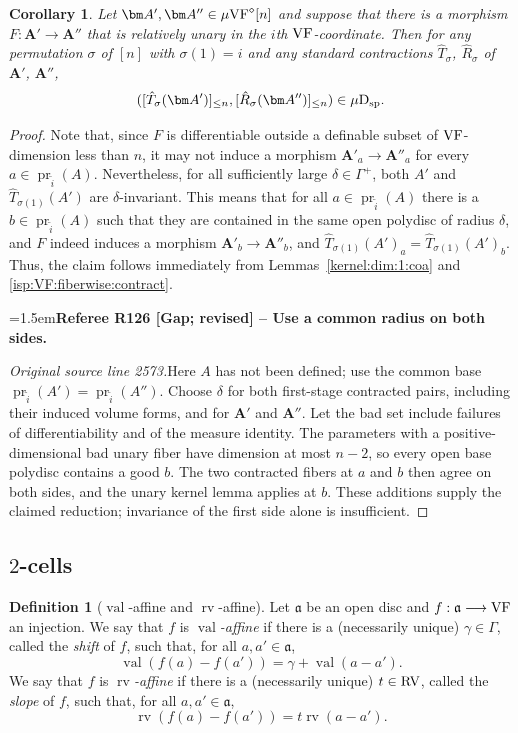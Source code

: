 \documentclass[12pt]{amsart}
\newcommand{\RefereeRemark}[4]{%
  \par\medskip\begingroup\normalfont\small\color{RefereePurple}%
  \emergencystretch=1.5em\noindent\textbf{Referee R#1 [#2] -- #3.}\par\nobreak\noindent #4\par
  \endgroup\medskip
}
\newcommand{\memph}[1]{{\color{magenta}\emph{#1}}}
\theoremstyle{plain}
\newtheorem{cor}[thm]{Corollary}
\theoremstyle{definition}
\newtheorem{defn}[thm]{Definition}
\theoremstyle{remark}
\numberwithin{equation}{section}
\theoremstyle{plain}
\newcommand{\VF}{\textup{VF}}
\newcommand{\RV}{\textup{RV}}
\DeclareMathOperator{\pr}{pr}
\newcommand{\ga}{\mathfrak{a}}
\newcommand{\0}{\emptyset}
\newcommand{\fun}{\longrightarrow}
\newcommand{\mVF}{{\mu}{\VF}}
\newcommand{\dsp}{\textup{D}_{\textup{sp}}}
\newcommand{\mispdb}{\mu \dsp}
\DeclareMathOperator{\rv}{rv}
\DeclareMathOperator{\vv}{val}
\begin{document}
\begin{cor}\label{contraction:same:perm:isp}
Let $\bm A', \bm A'' \in \mVF^{\diamond}[n]$ and suppose that there is a morphism $F : \bm A' \fun \bm A''$ that is relatively unary in the $i$th $\VF$-coordinate. Then for any permutation $\sigma$ of $[n]$ with $\sigma(1) = i$ and any standard contractions $\hat T_{\sigma}$, $\hat R_{\sigma}$ of $\bm A'$, $\bm A''$,
\[
([\hat T_{\sigma}(\bm A')]_{\leq n}, [\hat R_{\sigma}(\bm A'')]_{\leq n}) \in \mispdb.
\]
\end{cor}
\begin{proof}
Note that, since $F$ is differentiable outside a definable subset of $\VF$-dimension less than $n$, it may not induce a morphism $\bm A'_a \fun \bm A''_a$ for every $a \in \pr_{\tilde i}(A)$. Nevertheless, for all sufficiently large $\delta \in \Gamma^+$, both $A'$ and $\hat T_{\sigma(1)}(A')$ are $\delta$-invariant. This means that for all $a \in \pr_{\tilde i}(A)$ there is a $b \in \pr_{\tilde i}(A)$ such that they are contained in the same open polydisc of radius $\delta$, and $F$ indeed induces a morphism $\bm A'_b \fun \bm A''_b$, and $\hat T_{\sigma(1)}(A')_a = \hat T_{\sigma(1)}(A')_b$. Thus, the claim follows immediately from Lemmas~\ref{kernel:dim:1:coa} and \ref{isp:VF:fiberwise:contract}.

\RefereeRemark{126}{Gap; revised}{Use a common radius on both sides}{%
\textit{Original source line 2573.}\quad Here $A$ has not been defined; use the common base $\pr_{\tilde i}(A')=\pr_{\tilde i}(A'')$. Choose $\delta$ for both first-stage contracted pairs, including their induced volume forms, and for $\bm A'$ and $\bm A''$. Let the bad set include failures of differentiability and of the measure identity. The parameters with a positive-dimensional bad unary fiber have dimension at most $n-2$, so every open base polydisc contains a good $b$. The two contracted fibers at $a$ and $b$ then agree on both sides, and the unary kernel lemma applies at $b$. These additions supply the claimed reduction; invariance of the first side alone is insufficient.
}
\end{proof}

\subsection{$2$-cells}

\begin{defn}[$\vv$-affine and $\rv$-affine]\label{rvaffine}
Let $\ga$ be an open disc and $f : \ga \fun \VF$ an injection.
We say that $f$ is \memph{$\vv$-affine} if there is a (necessarily unique) $\gamma \in \Gamma$, called the \memph{shift} of $f$, such that, for all $a, a' \in \ga$,
\[
\vv(f(a) - f(a')) = \gamma + \vv(a - a').
\]
We say that $f$ is \memph{$\rv$-affine} if there is a (necessarily unique) $t \in \RV$, called the \memph{slope} of $f$, such that, for all $a, a' \in \ga$,
\[
\rv(f(a) - f(a')) = t \rv(a - a').
\]
\end{defn}
\end{document}
